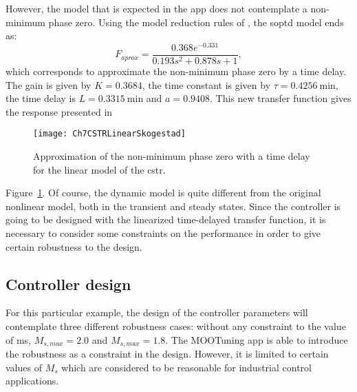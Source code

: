However, the model that is expected in the \matlab{} app does not contemplate a non-minimum phase zero. Using the model reduction rules of \citet{Skogestad2003}, the \gls{soptd} model ends as:
\begin{equation}
	F_{aprox} = \frac{0.368 e^{-0.331}}{0.193 s^2 + 0.878 s +1},
	\label{eq:Faprox}
\end{equation}
which corresponds to approximate the non-minimum phase zero by a time delay. The gain is given by $K=0.3684$, the time constant is given by $\tau= \SI{0.4256}{\minute}$, the time delay is $L= \SI{0.3315}{\minute}$ and $a = 0.9408$. This new transfer function gives the response presented in %
\begin{figure}[p]
	\centering
	\texttt{[image: Ch7CSTRLinearSkogestad]}
	\caption{Approximation of the non-minimum phase zero with a time delay for the linear model of the \gls{cstr}.}
	\label{fig:Ch7CSTRLinearSkogestad}
\end{figure}
%
Figure~\ref{fig:Ch7CSTRLinearSkogestad}. Of course, the dynamic model is quite different from the original nonlinear model, both in the transient and steady states. Since the controller is going to be designed with the linearized time-delayed transfer function, it is necessary to consider some constraints on the performance in order to give certain robustness to the design.

\subsection{Controller design}
For this particular example, the design of the controller parameters will contemplate three different robustness cases: without any constraint to the value of \gls{ms}, $M_{s,max} = 2.0$ and $M_{s,max} = 1.8$. The MOOTuning app is able to introduce the robustness as a constraint in the design. However, it is limited to certain values of $M_s$ which are considered to be reasonable for industrial control applications.

